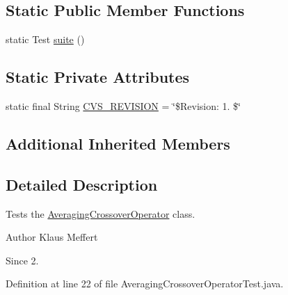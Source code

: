 \subsection*{Static Public Member Functions}
\begin{DoxyCompactItemize}
\item 
static Test \hyperlink{classorg_1_1jgap_1_1impl_1_1_averaging_crossover_operator_test_af464871bcab6cfd3a5ebc0c64d7a922c}{suite} ()
\end{DoxyCompactItemize}
\subsection*{Static Private Attributes}
\begin{DoxyCompactItemize}
\item 
static final String \hyperlink{classorg_1_1jgap_1_1impl_1_1_averaging_crossover_operator_test_a1b43c3cc2c1234476b994d0ea2b44ac5}{C\-V\-S\-\_\-\-R\-E\-V\-I\-S\-I\-O\-N} = \char`\"{}\$Revision\-: 1. \$\char`\"{}
\end{DoxyCompactItemize}
\subsection*{Additional Inherited Members}


\subsection{Detailed Description}
Tests the \hyperlink{classorg_1_1jgap_1_1impl_1_1_averaging_crossover_operator}{Averaging\-Crossover\-Operator} class.

\begin{DoxyAuthor}{Author}
Klaus Meffert 
\end{DoxyAuthor}
\begin{DoxySince}{Since}
2. 
\end{DoxySince}


Definition at line 22 of file Averaging\-Crossover\-Operator\-Test.\-java.



